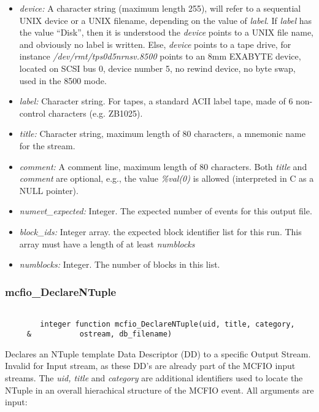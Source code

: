\begin{itemize} 
\item {\em device:} A  character
 string (maximum length 255), will refer to a  sequential UNIX device or a 
 UNIX filename, depending on the value of {\em label}.  If {\em label} has 
 the value ``Disk'', then it is understood the {\em device} points to 
 a UNIX file name, and obviously no label is written. Else, {\em device} points 
 to a tape drive, for instance {\em /dev/rmt/tps0d5nrnsv.8500} points to 
 an 8mm EXABYTE device, located on SCSI bus 0, device number 5, no rewind 
 device, no byte swap, used in the 8500 mode.  
\item {\em label:} Character string. For tapes, a standard ACII label tape, 
made of 6 non-control characters (e.g. ZB1025). 
\item {\em title:} Character string, maximum length of 80 characters, 
a mnemonic name for the stream.
\item {\em comment:} A comment line, maximum length of 80 characters. Both {\em title }
and {\em comment} are optional, e.g., the value {\em \%val(0)} is allowed
(interpreted in C as a NULL pointer).
\item {\em numevt\_expected:} Integer.  The expected number of events for this
output  file.
\item {\em block\_ids:} Integer array. the expected block identifier list for 
this run. This array must have a length of at least {\em numblocks}
\item {\em numblocks:} Integer. The number of blocks in this list.
\end{itemize}

\subsubsection{mcfio\_DeclareNTuple}

\begin{verbatim}

        integer function mcfio_DeclareNTuple(uid, title, category,
     &           ostream, db_filename)

\end{verbatim}

Declares an NTuple template Data Descriptor (DD) to a specific Output Stream.
Invalid for Input stream, as these DD's are already part of the  MCFIO input
streams.  The {\em uid, title } and {\em category} are additional  identifiers
used to locate the NTuple in an overall hierachical structure  of the MCFIO
event.  All arguments are input:

